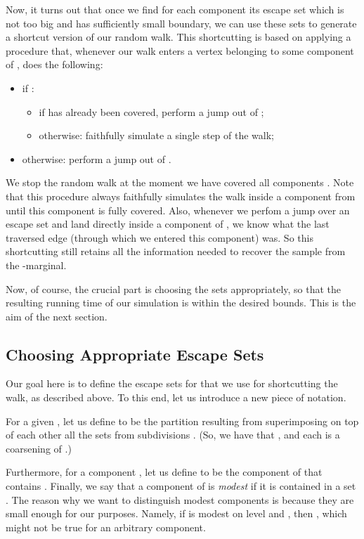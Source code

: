 \documentclass[11pt, letterpaper]{article}
\begin{document}
Now, it turns out that once we find for each component  its escape set  which is not too big and has sufficiently small boundary, we can use these sets to generate a shortcut version of our random walk. This shortcutting is based on applying a procedure that, whenever our walk enters a vertex  belonging to some component  of , does the following:
\begin{itemize}
	\item if :
	\begin{itemize}
		\item if  has already been covered, perform a jump out of ;
		\item otherwise: faithfully simulate a single step of the walk;
	\end{itemize}
	\item otherwise: perform a jump out of .
\end{itemize}
We stop the random walk at the moment we have covered all components . Note that this procedure always faithfully simulates the walk inside a component from  until this component is fully covered. Also, whenever we perfom a jump over an escape set and land directly inside a component of , we know what the last traversed edge (through which we entered this component) was. So this shortcutting still retains all the information needed to recover the sample from the -marginal.

Now, of course, the crucial part is choosing the sets  appropriately, so that the resulting running time of our simulation is within the desired bounds. This is the aim of the next section. 

\subsection{Choosing Appropriate Escape Sets}
Our goal here is to define the escape sets  for  that we use for shortcutting the walk, as described above. To this end, let us introduce a new piece of notation.

For a given , let us define  to be the partition resulting from superimposing on top of each other all the sets from subdivisions . (So, we have that ,  and each  is a coarsening of .)

 Furthermore, for a component , let us define  to be the component of  that contains . Finally, we say that a component  of  is \emph{modest} if it is contained in a set . The reason why we want to distinguish modest components is because they are small enough for our purposes. Namely, if  is modest on level  and , then , which might not be true for an arbitrary component.
\end{document}
